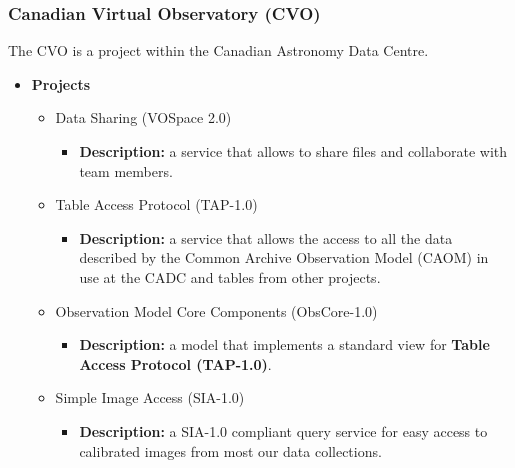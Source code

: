 \subsubsection{Canadian Virtual Observatory (CVO)}
The CVO \cite{website:cvo-home} \nocite{SchadeDowlerDurand2004} is a project
within the Canadian Astronomy Data Centre.

\begin{itemize}
\item \textbf{Projects}
\begin{itemize}
\item Data Sharing (VOSpace 2.0)
\begin{itemize}
\item \textbf{Description:} a service that allows to share files and collaborate
with team members.
\end{itemize}
\item Table Access Protocol (TAP-1.0)
\begin{itemize}
\item \textbf{Description:} a service that allows the access to all the data
described by the Common Archive Observation Model (CAOM) in use at the CADC and
tables from other projects.
\end{itemize}
\item Observation Model Core Components (ObsCore-1.0)
\begin{itemize}
\item \textbf{Description:} a model that implements a standard view for
\textbf{Table Access Protocol (TAP-1.0)}.
\end{itemize}
\item Simple Image Access (SIA-1.0)
\begin{itemize}
\item \textbf{Description:} a SIA-1.0 compliant query service for easy access to
calibrated images from most our data collections.
\end{itemize}
\end{itemize}
\end{itemize}

